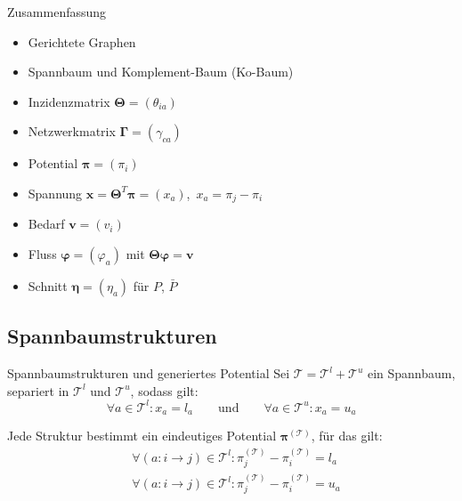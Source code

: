 \documentclass[accentcolor = tud11b, colorbacktitle, landscape, german, presentation, tudmathserif]{tudbeamer}
\newcommand{\mat}[1]{\boldsymbol{\mathbf{#1}}}
\renewcommand{\vec}[1]{\boldsymbol{\mathbf{#1}}}
\begin{document}
			\begin{frame}{Zusammenfassung}
				\begin{itemize}
					\item Gerichtete Graphen
					\item Spannbaum und Komplement-Baum (Ko-Baum)
					\item Inzidenzmatrix \tabto{3cm} \( \mat{\Theta} = (\theta_{ia}) \)
					\item Netzwerkmatrix \tabto{3cm} \( \mat{\Gamma} = (\gamma_{ca}) \)
					\item Potential      \tabto{3cm} \( \vec{\pi} = (\pi_i) \)
					\item Spannung       \tabto{3cm} \( \vec{x} = \mat{\Theta}^T \vec{\pi} = (x_a) \),\, \( x_a = \pi_j - \pi_i \)
					\item Bedarf         \tabto{3cm} \( \vec{v} = (v_i) \)
					\item Fluss          \tabto{3cm} \( \vec{\varphi} = (\varphi_a) \) mit \( \mat{\Theta} \vec{\varphi} = \vec{v} \)
					\item Schnitt        \tabto{3cm} \( \vec{\eta} = (\eta_a) \) für \( P \), \( \bar{P} \)
				\end{itemize}
			\end{frame}
		
		\subsection{Spannbaumstrukturen}
			\begin{frame}{Spannbaumstrukturen und generiertes Potential}
				Sei \( \mathcal{T} = \mathcal{T}^l + \mathcal{T}^u \) ein Spannbaum, separiert in \( \mathcal{T}^l \) und \( \mathcal{T}^u \), sodass gilt:
				\begin{equation*}
					\forall a \in \mathcal{T}^l : x_a = l_a \qquad\text{und}\qquad \forall a \in \mathcal{T}^u : x_a = u_a
				\end{equation*}
				
				\vspace{0.5cm}
				Jede Struktur bestimmt ein eindeutiges Potential \( \vec{\pi}^{(\mathcal{T})} \), für das gilt:
				\begin{align*}
					& \forall (a : i \to j) \in \mathcal{T}^l : \pi^{(\mathcal{T})}_j - \pi^{(\mathcal{T})}_i = l_a \\
					& \forall (a : i \to j) \in \mathcal{T}^l : \pi^{(\mathcal{T})}_j - \pi^{(\mathcal{T})}_i = u_a
				\end{align*}
			\end{frame}
		
\end{document}
